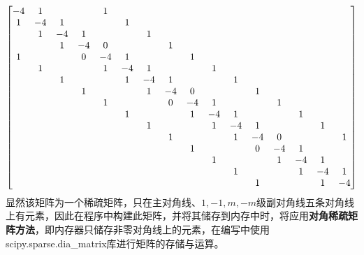 \documentclass{article} %
\begin{document}
\begin{align}
    \addtocounter{MaxMatrixCols}{25}
    \begin{bmatrix}
        -4 & 1  &    &    & 1                                                         \\
        1  & -4 & 1  &    &    & 1                                                    \\
           & 1  & -4 & 1  &    &    & 1                                               \\
           &    & 1  & -4 & 0  &    &    & 1                                          \\
        1  &    &    & 0  & -4 & 1  &    &    & 1                                     \\
           & 1  &    &    & 1  & -4 & 1  &    &    & 1                                \\
           &    & 1  &    &    & 1  & -4 & 1  &    &    & 1                           \\
           &    &    & 1  &    &    & 1  & -4 & 0  &    &    & 1                      \\
           &    &    &    & 1  &    &    & 0  & -4 & 1  &    &    & 1                 \\
           &    &    &    &    & 1  &    &    & 1  & -4 & 1  &    &    & 1            \\
           &    &    &    &    &    & 1  &    &    & 1  & -4 & 1  &    &    & 1       \\
           &    &    &    &    &    &    & 1  &    &    & 1  & -4 & 0  &    &    & 1  \\
           &    &    &    &    &    &    &    & 1  &    &    & 0  & -4 & 1  &    &    \\
           &    &    &    &    &    &    &    &    & 1  &    &    & 1  & -4 & 1  &    \\
           &    &    &    &    &    &    &    &    &    & 1  &    &    & 1  & -4 & 1  \\
           &    &    &    &    &    &    &    &    &    &    & 1  &    &    & 1  & -4 \\
    \end{bmatrix}
\end{align}
显然该矩阵为一个稀疏矩阵，只在主对角线、$1,-1,m,-m$级副对角线五条对角线上有元素，因此在程序中构建此矩阵，并将其储存到内存中时，将应用\textbf{对角稀疏矩阵方法}，即内存器只储存非零对角线上的元素，在编写中使用scipy.sparse.dia\_matrix库进行矩阵的存储与运算。
\end{document}
